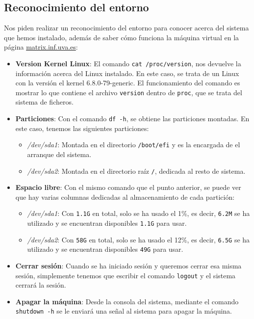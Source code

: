 \documentclass[10pt]{article}
\begin{document}
	\subsection{Reconocimiento del entorno}
	Nos piden realizar un reconocimiento del entorno para conocer acerca del sistema que hemos instalado, además de saber cómo funciona la máquina virtual en la página \url{matrix.inf.uva.es}:
	\begin{itemize}
		\item \textbf{Version Kernel Linux}: El comando \verb|cat /proc/version|, nos devuelve la información acerca del Linux instalado. En este caso, se trata de un Linux con la versión el kernel 6.8.0-79-generic. El funcionamiento del comando es mostrar lo que contiene el archivo \verb|version| dentro de \verb|proc|, que se trata del sistema de ficheros.
		\item \textbf{Particiones}: Con el comando \verb|df -h|, se obtiene las particiones montadas. En este caso, tenemos las siguientes particiones:
		\begin{itemize}
			\item \textit{/dev/sda1}: Montada en el directorio \verb|/boot/efi| y es la encargada de el arranque del sistema. 
			\item \textit{/dev/sda2}: Montada en el directorio raíz \verb|/|, dedicada al resto de sistema.
		\end{itemize}
		\item \textbf{Espacio libre}: Con el mismo comando que el punto anterior, se puede ver que hay varias columnas dedicadas al almacenamiento de cada partición:
		\begin{itemize}
			\item \textit{/dev/sda1}: Con \verb|1.1G| en total, solo se ha usado el 1\%, es decir, \verb|6.2M| se ha utilizado y se encuentran disponibles \verb|1.1G| para usar.
			\item \textit{/dev/sda2}: Con \verb|58G| en total, solo se ha usado el 12\%, es decir, \verb|6.5G| se ha utilizado y se encuentran disponibles \verb|49G| para usar.
		\end{itemize}
		\item \textbf{Cerrar sesión}: Cuando se ha iniciado sesión y queremos cerrar esa misma sesión, simplemente tenemos que escribir el comando \verb|logout| y el sistema cerrará la sesión.
		\item \textbf{Apagar la máquina}: Desde la consola del sistema, mediante el comando \verb|shutdown -h| se le enviará una señal al sistema para apagar la máquina.

\end{itemize}
\end{document}

